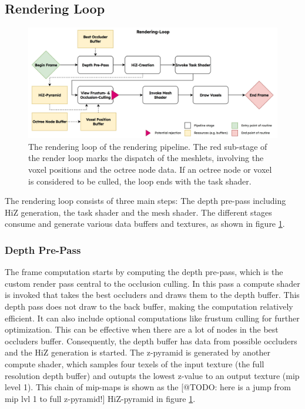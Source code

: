 \subsection*{Rendering Loop} \label{sec-rendering-loop}

\begin{figure}[h]
    \centering
    \includegraphics[width=\linewidth]{images/graphics/rendering-loop.jpg}
    \caption{The rendering loop of the rendering pipeline. The red sub-stage of the render loop marks the dispatch 
    of the meshlets, involving the voxel positions and the octree node data. If an octree node or voxel is considered 
    to be culled, the loop ends with the task shader.}
    \label{fig:pipeline-loop}
\end{figure}

\noindent
The rendering loop consists of three main steps: The depth pre-pass including \ac{HiZ} generation, the 
task shader and the mesh shader. The different stages consume and generate various data buffers 
and textures, as shown in figure \ref{fig:pipeline-loop}. 

\subsubsection*{Depth Pre-Pass} \label{subsec-depth-prepass}

The frame computation starts by computing the depth pre-pass, which is the custom render pass central 
to the occlusion culling. In this pass a compute shader is invoked that takes the best occluders and 
draws them to the depth buffer. This depth pass does not draw to the back buffer, making the computation 
relatively efficient. It can also include optional computations like frustum culling for further 
optimization. This can be effective when there are a lot of nodes in the best occluders buffer. 
Consequently, the depth buffer has data from possible occluders and the \ac{HiZ} generation is started. 
The z-pyramid is generated by another compute shader, which samples four texels of the input texture 
(the full resolution depth buffer) and outupts the lowest z-value to an output texture (mip level 1). 
This chain of mip-maps is shown as the [@TODO: here is a jump from mip lvl 1 to full z-pyramid!]
\ac{HiZ}-pyramid in figure \ref{fig:pipeline-loop}.


